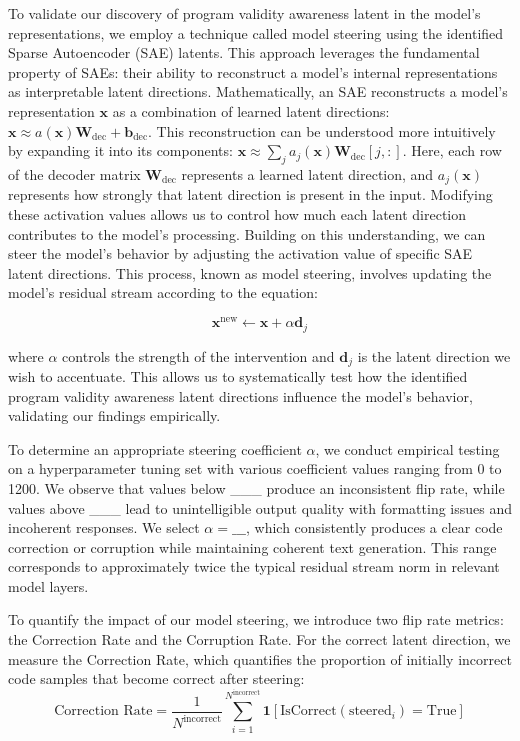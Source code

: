 To validate our discovery of program validity awareness latent in the model's representations, we employ a technique called model steering using the identified Sparse Autoencoder (SAE) latents. This approach leverages the fundamental property of SAEs: their ability to reconstruct a model's internal representations as interpretable latent directions. Mathematically, an SAE reconstructs a model's representation $\mathbf{x}$ as a combination of learned latent directions: $\mathbf{x} \approx a(\mathbf{x})\mathbf{W}_{\text{dec}} + \mathbf{b}_{\text{dec}}$.
This reconstruction can be understood more intuitively by expanding it into its components: $\mathbf{x} \approx \sum_j a_j(\mathbf{x})\mathbf{W}_{\text{dec}}[j,:]$. Here, each row of the decoder matrix $\mathbf{W}_{\text{dec}}$ represents a learned latent direction, and $a_j(\mathbf{x})$ represents how strongly that latent direction is present in the input. Modifying these activation values allows us to control how much each latent direction contributes to the model's processing.
Building on this understanding, we can steer the model's behavior by adjusting the activation value of specific SAE latent directions. This process, known as model steering, involves updating the model's residual stream according to the equation:

\begin{equation}
\mathbf{x}^{\text{new}} \leftarrow \mathbf{x} + \alpha\mathbf{d}_j
\end{equation}

where $\alpha$ controls the strength of the intervention and $\mathbf{d}_j$ is the latent direction we wish to accentuate. This allows us to systematically test how the identified program validity awareness latent directions influence the model's behavior, validating our findings empirically.

To determine an appropriate steering coefficient $\alpha$, we conduct empirical testing on a hyperparameter tuning set with various coefficient values ranging from 0 to 1200. We observe that values below \_\_\_ produce an inconsistent flip rate, while values above \_\_\_ lead to unintelligible output quality with formatting issues and incoherent responses. We select $\alpha = \_\_\_$, which consistently produces a clear code correction or corruption while maintaining coherent text generation. This range corresponds to approximately twice the typical residual stream norm in relevant model layers.

To quantify the impact of our model steering, we introduce two flip rate metrics: the Correction Rate and the Corruption Rate. For the correct latent direction, we measure the Correction Rate, which quantifies the proportion of initially incorrect code samples that become correct after steering:
\begin{equation}
\text{Correction Rate} = \frac{1}{N^{\text{incorrect}}} \sum_{i=1}^{N^{\text{incorrect}}} \mathbf{1}[\text{IsCorrect}(\text{steered}_i)= \text{True}]
\end{equation}

